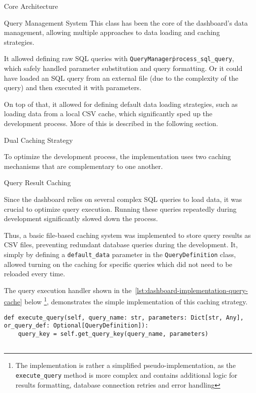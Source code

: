 \begin{section}{Core Architecture}
\begin{subsection}{Query Management System}
		This class has been the core of the dashboard's data management, allowing multiple approaches to data loading and caching strategies.

		It allowed defining raw SQL queries with \texttt{QueryManager\.process\_sql\_query}, which safely handled parameter substitution and query formatting.
		Or it could have loaded an SQL query from an external file (due to the complexity of the query) and then executed it with parameters.

		On top of that, it allowed for defining default data loading strategies, such as loading data from a local CSV cache, which significantly sped up the development process.
		More of this is described in the following section.
	\end{subsection}

	\begin{subsection}{Dual Caching Strategy}
		\label{subsec:implementation-core-architecture-caching}

		To optimize the development process, the implementation uses two caching mechanisms that are complementary to one another.

		\begin{subsubsection}{Query Result Caching}
			\label{subsubsec:implementation-core-architecture-query-cache}

			Since the dashboard relies on several complex SQL queries to load data, it was crucial to optimize query execution.
			Running these queries repeatedly during development significantly slowed down the process.

			Thus, a basic file-based caching system was implemented to store query results as CSV files, preventing redundant database queries during the development.
			It, simply by defining a \texttt{default\_data} parameter in the \texttt{QueryDefinition} class, allowed turning on the caching for specific queries which did not need to be reloaded every time.

			The query execution handler shown in the~\autoref{lst:dashboard-implementation-query-cache} below
			\footnote{The implementation is rather a simplified pseudo-implementation, as the \texttt{execute\_query} method is more complex and contains additional logic for results formatting, database connection retries and error handling},
			demonstrates the simple implementation of this caching strategy.

			\begin{listing}[h]
				\caption{Query Result Caching Implementation}
				\begin{verbatim}
def execute_query(self, query_name: str, parameters: Dict[str, Any], or_query_def: Optional[QueryDefinition]):
    query_key = self.get_query_key(query_name, parameters)


\end{verbatim}
\end{listing}
\end{subsubsection}
\end{subsection}
\end{section}
